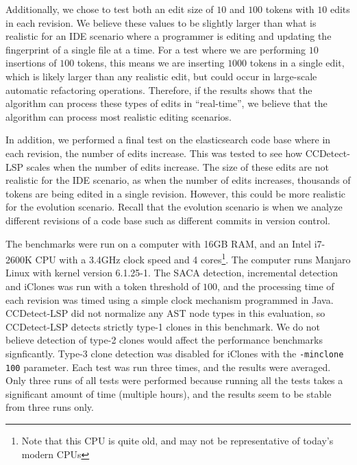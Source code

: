 Additionally, we chose to test both an edit size of $10$ and $100$ tokens with $10$ edits
in each revision. We believe these values to be slightly larger than what is realistic for
an IDE scenario where a programmer is editing and updating the fingerprint of a single
file at a time. For a test where we are performing $10$ insertions of $100$ tokens, this
means we are inserting $1000$ tokens in a single edit, which is likely larger than any
realistic edit, but could occur in large-scale automatic refactoring operations.
Therefore, if the results shows that the algorithm can process these types of edits in
``real-time'', we believe that the algorithm can process most realistic editing scenarios.

In addition, we performed a final test on the elasticsearch code base where in each
revision, the number of edits increase. This was tested to see how CCDetect-LSP scales
when the number of edits increase. The size of these edits are not realistic for the IDE
scenario, as when the number of edits increases, thousands of tokens are being edited in a
single revision. However, this could be more realistic for the evolution scenario. Recall
that the evolution scenario is when we analyze different revisions of a code base such as
different commits in version control.

The benchmarks were run on a computer with 16GB RAM, and an Intel i7-2600K CPU with a
3.4GHz clock speed and 4 cores\footnote{Note that this CPU is quite old, and may not be
representative of today's modern CPUs}. The computer runs Manjaro Linux with kernel
version 6.1.25-1. The SACA detection, incremental detection and iClones was run with a
token threshold of $100$, and the processing time of each revision was timed using a
simple clock mechanism programmed in Java. CCDetect-LSP did not normalize any AST node
types in this evaluation, so CCDetect-LSP detects strictly type-1 clones in this
benchmark. We do not believe detection of type-2 clones would affect the performance
benchmarks signficantly. Type-3 clone detection was disabled for iClones with the
\verb|-minclone 100| parameter. Each test was run three times, and the results were
averaged. Only three runs of all tests were performed because running all the tests takes
a significant amount of time (multiple hours), and the results seem to be stable from
three runs only.



